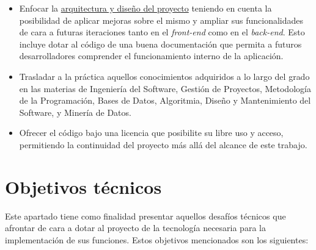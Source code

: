\begin{itemize} [\textbullet]
\item Enfocar la \hyperref[sec:arquitectura]{arquitectura y diseño del proyecto} teniendo en cuenta la posibilidad de aplicar mejoras sobre el mismo y ampliar sus funcionalidades de cara a futuras iteraciones tanto en el \emph{front-end} como en el \emph{back-end}. Esto incluye dotar al código de una buena documentación que permita a futuros desarrolladores comprender el funcionamiento interno de la aplicación.
\item Trasladar a la práctica aquellos conocimientos adquiridos a lo largo del grado en las materias de Ingeniería del Software, Gestión de Proyectos, Metodología de la Programación, Bases de Datos, Algoritmia, Diseño y Mantenimiento del Software, y Minería de Datos.
\item Ofrecer el código bajo una licencia que posibilite su libre uso y acceso, permitiendo la continuidad del proyecto más allá del alcance de este trabajo.

\end{itemize}

\bigskip

\section{Objetivos técnicos}

Este apartado tiene como finalidad presentar aquellos desafíos técnicos que afrontar de cara a dotar al proyecto de la tecnología necesaria para la implementación de sus funciones. Estos objetivos mencionados son los siguientes:

